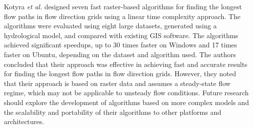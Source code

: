 \documentclass[journal, a4paper]{IEEEtran}
\begin{document}
	Kotyra \textit{et al.} \cite{KOTYRA2023105728} designed seven fast raster-based algorithms for finding the longest flow paths in flow direction grids using a linear time complexity approach. The algorithms were evaluated using eight large datasets, generated using a hydrological model, and compared with existing GIS software. The algorithms achieved significant speedups, up to 30 times faster on Windows and 17 times faster on Ubuntu, depending on the dataset and algorithm used. The authors concluded that their approach was effective in achieving fast and accurate results for finding the longest flow paths in flow direction grids. However, they noted that their approach is based on raster data and assumes a steady-state flow regime, which may not be applicable to unsteady flow conditions. Future research should explore the development of algorithms based on more complex models and the scalability and portability of their algorithms to other platforms and architectures.
	
	



	
	
\end{document}

